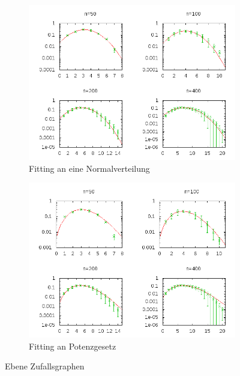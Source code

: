 \documentclass[10pt]{article}
\begin{document}
\begin{figure}[htb!]
\begin{subfigure}{.5\textwidth}
  \centering
  \includegraphics[width=1\linewidth]{../Results/wErrorbars_Normal_Planar.png}
  \caption{Fitting an eine Normalverteilung}
\end{subfigure}%
\begin{subfigure}{.5\textwidth}
  \centering
  \includegraphics[width=1\linewidth]{../Results/wErrorbars_Power_Planar.png}
  \caption{Fitting an Potenzgesetz}
\end{subfigure}
\caption{Ebene Zufallsgraphen}
\label{fig:planar}
\end{figure}
\end{document}
